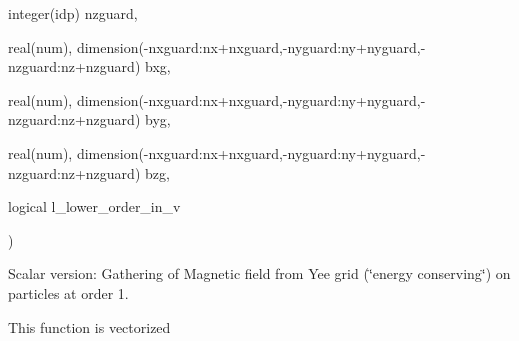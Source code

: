 {\begin{DoxyParamCaption}
\item[{integer(idp)}]{nzguard, }
\item[{real(num), dimension(-\/nxguard\+:nx+nxguard,-\/nyguard\+:ny+nyguard,-\/nzguard\+:nz+nzguard)}]{bxg, }
\item[{real(num), dimension(-\/nxguard\+:nx+nxguard,-\/nyguard\+:ny+nyguard,-\/nzguard\+:nz+nzguard)}]{byg, }
\item[{real(num), dimension(-\/nxguard\+:nx+nxguard,-\/nyguard\+:ny+nyguard,-\/nzguard\+:nz+nzguard)}]{bzg, }
\item[{logical}]{l\+\_\+lower\+\_\+order\+\_\+in\+\_\+v}
\end{DoxyParamCaption}
)}\hypertarget{field__gathering__3d__o1_8_f90_a35b7fbf406b705b1a34472523046d1b1}{}\label{field__gathering__3d__o1_8_f90_a35b7fbf406b705b1a34472523046d1b1}


Scalar version\+: Gathering of Magnetic field from Yee grid (\char`\"{}energy conserving\char`\"{}) on particles at order 1. 

This function is vectorized 

